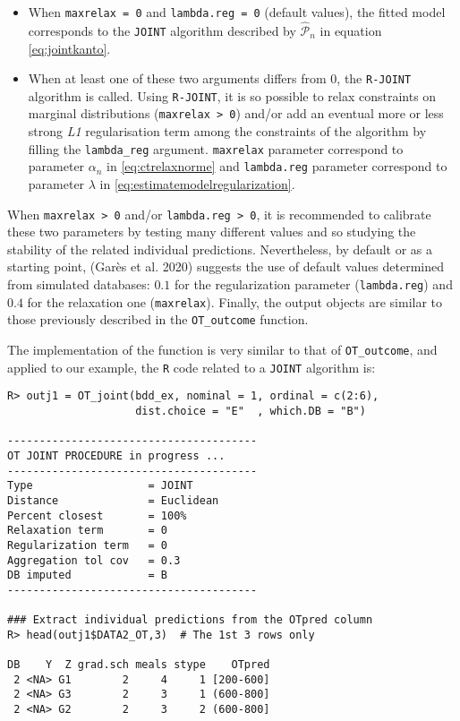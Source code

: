\begin{itemize}
\tightlist
\item
  When \texttt{maxrelax\ =\ 0} and \texttt{lambda.reg\ =\ 0} (default values), the fitted model corresponds to the \texttt{JOINT} algorithm described by \(\hat{\mathcal{P}}_n\) in equation \eqref{eq:jointkanto}.
\item
  When at least one of these two arguments differs from 0, the \texttt{R-JOINT} algorithm is called. Using \texttt{R-JOINT}, it is so possible to relax constraints on marginal distributions (\texttt{maxrelax\ \textgreater{}\ 0}) and/or add an eventual more or less strong \emph{L1} regularisation term among the constraints of the algorithm by filling the \texttt{lambda\_reg} argument. \texttt{maxrelax} parameter correspond to parameter \(\alpha_n\) in \eqref{eq:ctrelaxnorme} and \texttt{lambda.reg} parameter correspond to parameter \(\lambda\) in \eqref{eq:estimatemodelregularization}.
\end{itemize}

When \texttt{maxrelax\ \textgreater{}\ 0} and/or \texttt{lambda.reg\ \textgreater{}\ 0}, it is recommended to calibrate these two parameters by testing many different values and so studying the stability of the related individual predictions. Nevertheless, by default or as a starting point, (Garès et al. 2020) suggests the use of default values determined from simulated databases: \(0.1\) for the regularization parameter (\texttt{lambda.reg}) and \(0.4\) for the relaxation one (\texttt{maxrelax}). Finally, the output objects are similar to those previously described in the \texttt{OT\_outcome} function.

The implementation of the function is very similar to that of \texttt{OT\_outcome}, and applied to our example, the \texttt{R} code related to a \texttt{JOINT} algorithm is:

\begin{verbatim}
R> outj1 = OT_joint(bdd_ex, nominal = 1, ordinal = c(2:6), 
                    dist.choice = "E"  , which.DB = "B")

---------------------------------------
OT JOINT PROCEDURE in progress ...
---------------------------------------
Type                  = JOINT
Distance              = Euclidean
Percent closest       = 100%
Relaxation term       = 0
Regularization term   = 0
Aggregation tol cov   = 0.3
DB imputed            = B
---------------------------------------

### Extract individual predictions from the OTpred column
R> head(outj1$DATA2_OT,3)  # The 1st 3 rows only

DB    Y  Z grad.sch meals stype    OTpred
 2 <NA> G1        2     4     1 [200-600]
 2 <NA> G3        2     3     1 (600-800]
 2 <NA> G2        2     3     2 (600-800]
\end{verbatim}

